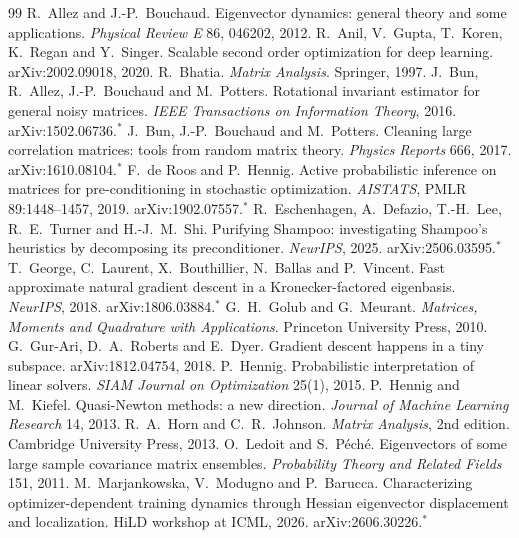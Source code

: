 \documentclass[11pt,a4paper]{article}
\theoremstyle{plain}
\theoremstyle{definition}
\theoremstyle{remark}
\begin{document}
\begin{thebibliography}{99}\setlength{\itemsep}{2pt}\small
{} R.~Allez and J.-P.~Bouchaud. Eigenvector dynamics: general theory and some applications.
  \emph{Physical Review E} 86, 046202, 2012.
 R.~Anil, V.~Gupta, T.~Koren, K.~Regan and Y.~Singer. Scalable second order optimization for deep
  learning. arXiv:2002.09018, 2020.
 R.~Bhatia. \emph{Matrix Analysis}. Springer, 1997.
 J.~Bun, R.~Allez, J.-P.~Bouchaud and M.~Potters. Rotational invariant estimator for general noisy
  matrices. \emph{IEEE Transactions on Information Theory}, 2016. arXiv:1502.06736.$^*$
 J.~Bun, J.-P.~Bouchaud and M.~Potters. Cleaning large correlation matrices: tools from random matrix
  theory. \emph{Physics Reports} 666, 2017. arXiv:1610.08104.$^*$
 F.~de Roos and P.~Hennig. Active probabilistic inference on matrices for pre-conditioning in
  stochastic optimization. \emph{AISTATS}, PMLR 89:1448--1457, 2019. arXiv:1902.07557.$^*$
 R.~Eschenhagen, A.~Defazio, T.-H.~Lee, R.~E.~Turner and H.-J.~M.~Shi. Purifying Shampoo:
  investigating Shampoo's heuristics by decomposing its preconditioner. \emph{NeurIPS}, 2025. arXiv:2506.03595.$^*$
 T.~George, C.~Laurent, X.~Bouthillier, N.~Ballas and P.~Vincent. Fast approximate natural gradient
  descent in a Kronecker-factored eigenbasis. \emph{NeurIPS}, 2018. arXiv:1806.03884.$^*$
 G.~H.~Golub and G.~Meurant. \emph{Matrices, Moments and Quadrature with Applications}. Princeton
  University Press, 2010.
 G.~Gur-Ari, D.~A.~Roberts and E.~Dyer. Gradient descent happens in a tiny subspace.
  arXiv:1812.04754, 2018.
 P.~Hennig. Probabilistic interpretation of linear solvers. \emph{SIAM Journal on Optimization}
  25(1), 2015.
 P.~Hennig and M.~Kiefel. Quasi-Newton methods: a new direction. \emph{Journal of Machine
  Learning Research} 14, 2013.
 R.~A.~Horn and C.~R.~Johnson. \emph{Matrix Analysis}, 2nd edition. Cambridge University Press, 2013.
 O.~Ledoit and S.~P\'ech\'e. Eigenvectors of some large sample covariance matrix ensembles.
  \emph{Probability Theory and Related Fields} 151, 2011.
 M.~Marjankowska, V.~Modugno and P.~Barucca. Characterizing optimizer-dependent training
  dynamics through Hessian eigenvector displacement and localization. HiLD workshop at ICML, 2026.
  arXiv:2606.30226.$^*$

\end{thebibliography}
\end{document}
